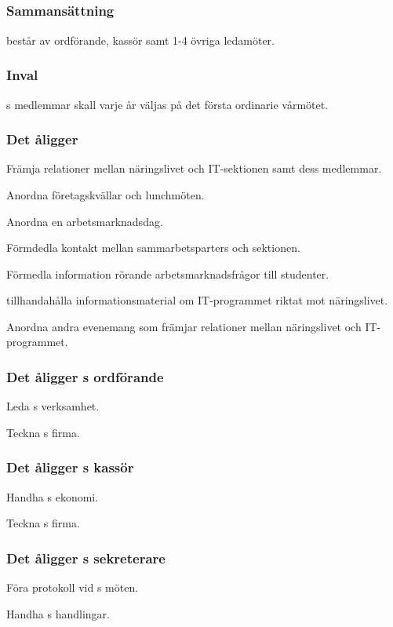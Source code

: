 \subsection{\ARMITFULL{}}
\subsubsection{Sammansättning}
\ARMIT{} består av ordförande, kassör samt 1-4 övriga ledamöter.

\subsubsection{Inval}
\ARMIT{}s medlemmar skall varje år väljas på det första ordinarie vårmötet.

\subsubsection{Det åligger \ARMIT{}}
\begin{att}
	\item Främja relationer mellan näringslivet och IT-sektionen samt dess medlemmar.
	\item Anordna företagskvällar och lunchmöten.
	\item Anordna en arbetsmarknadsdag.
	\item Förmdedla kontakt mellan sammarbetsparters och sektionen.
	\item Förmedla information rörande arbetsmarknadsfrågor till studenter.
	\item tillhandahålla informationsmaterial om IT-programmet riktat mot näringslivet.
	\item Anordna andra evenemang som främjar relationer mellan näringslivet och IT-programmet.
\end{att}

\subsubsection{Det åligger \ARMIT{}s ordförande}
\begin{att}
	\item Leda \ARMIT{}s verksamhet.
	\item Teckna \ARMIT{}s firma.
\end{att}

\subsubsection{Det åligger \ARMIT{}s kassör}
\begin{att}
	\item Handha \ARMIT{}s ekonomi.
	\item Teckna \ARMIT{}s firma.
\end{att}

\subsubsection{Det åligger \ARMIT{}s sekreterare}
\begin{att}
	\item Föra protokoll vid \ARMIT{}s möten.
	\item Handha \ARMIT{}s handlingar.
\end{att}